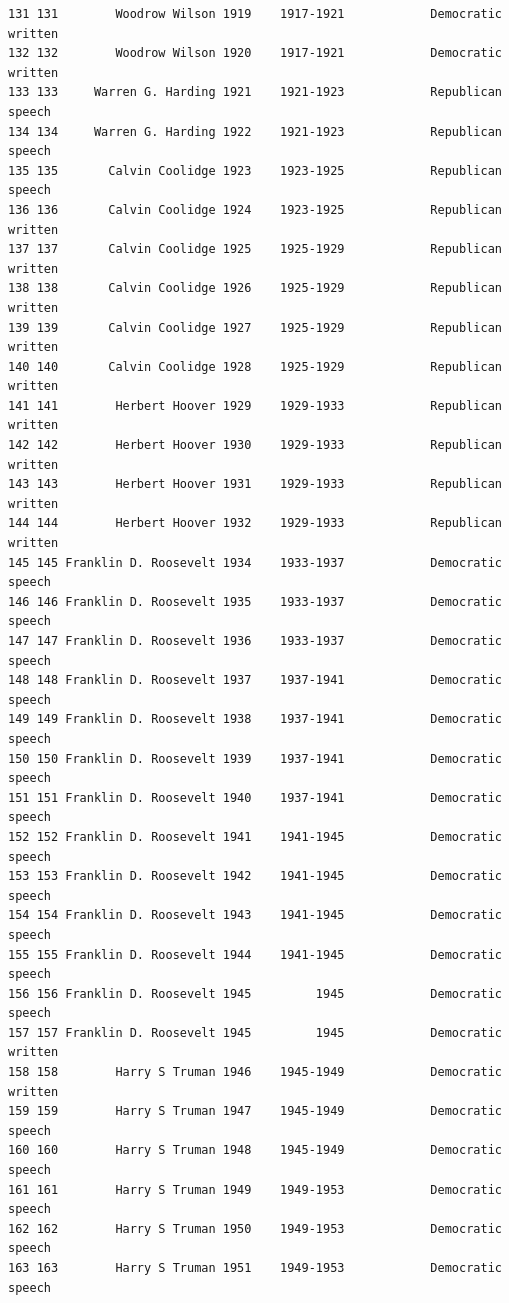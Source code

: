 \documentclass[
  letterpaper,
  DIV=11,
  numbers=noendperiod]{scrreprt}
\begin{document}
\begin{verbatim}
131 131        Woodrow Wilson 1919    1917-1921            Democratic   written
132 132        Woodrow Wilson 1920    1917-1921            Democratic   written
133 133     Warren G. Harding 1921    1921-1923            Republican    speech
134 134     Warren G. Harding 1922    1921-1923            Republican    speech
135 135       Calvin Coolidge 1923    1923-1925            Republican    speech
136 136       Calvin Coolidge 1924    1923-1925            Republican   written
137 137       Calvin Coolidge 1925    1925-1929            Republican   written
138 138       Calvin Coolidge 1926    1925-1929            Republican   written
139 139       Calvin Coolidge 1927    1925-1929            Republican   written
140 140       Calvin Coolidge 1928    1925-1929            Republican   written
141 141        Herbert Hoover 1929    1929-1933            Republican   written
142 142        Herbert Hoover 1930    1929-1933            Republican   written
143 143        Herbert Hoover 1931    1929-1933            Republican   written
144 144        Herbert Hoover 1932    1929-1933            Republican   written
145 145 Franklin D. Roosevelt 1934    1933-1937            Democratic    speech
146 146 Franklin D. Roosevelt 1935    1933-1937            Democratic    speech
147 147 Franklin D. Roosevelt 1936    1933-1937            Democratic    speech
148 148 Franklin D. Roosevelt 1937    1937-1941            Democratic    speech
149 149 Franklin D. Roosevelt 1938    1937-1941            Democratic    speech
150 150 Franklin D. Roosevelt 1939    1937-1941            Democratic    speech
151 151 Franklin D. Roosevelt 1940    1937-1941            Democratic    speech
152 152 Franklin D. Roosevelt 1941    1941-1945            Democratic    speech
153 153 Franklin D. Roosevelt 1942    1941-1945            Democratic    speech
154 154 Franklin D. Roosevelt 1943    1941-1945            Democratic    speech
155 155 Franklin D. Roosevelt 1944    1941-1945            Democratic    speech
156 156 Franklin D. Roosevelt 1945         1945            Democratic    speech
157 157 Franklin D. Roosevelt 1945         1945            Democratic   written
158 158        Harry S Truman 1946    1945-1949            Democratic   written
159 159        Harry S Truman 1947    1945-1949            Democratic    speech
160 160        Harry S Truman 1948    1945-1949            Democratic    speech
161 161        Harry S Truman 1949    1949-1953            Democratic    speech
162 162        Harry S Truman 1950    1949-1953            Democratic    speech
163 163        Harry S Truman 1951    1949-1953            Democratic    speech

\end{verbatim}
\end{document}
